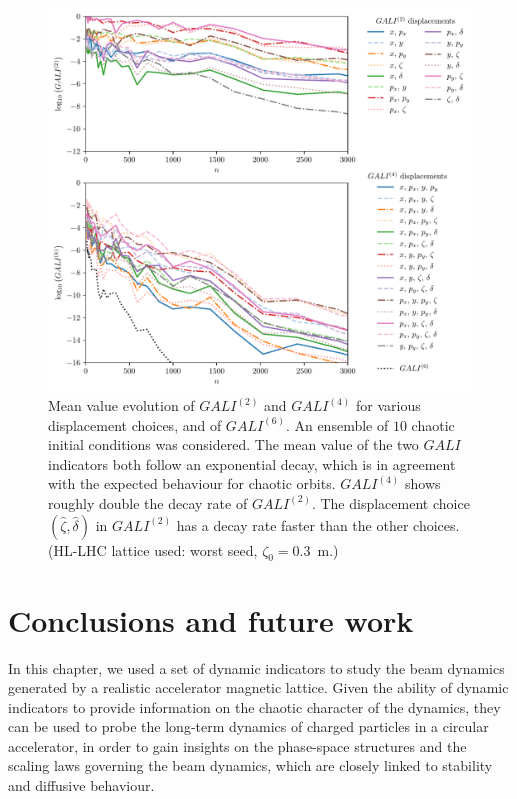 \begin{figure}
    \centering
    \includegraphics[width=1.0\textwidth]{6_lhc_dynamic_indicators/figs/updated/evolution_gali_4_chaos.pdf}
    \caption{Mean value evolution of $GALI^{(2)}$ and $GALI^{(4)}$ for various displacement choices, and of $GALI^{(6)}$. An ensemble of $10$ chaotic initial conditions was considered. The mean value of the two $GALI$ indicators both follow an exponential decay, which is in agreement with the expected behaviour for chaotic orbits. $GALI^{(4)}$ shows roughly double the decay rate of $GALI^{(2)}$. The displacement choice $(\hat{\zeta}, \hat{\delta})$ in $GALI^{(2)}$ has a decay rate faster than the other choices. (HL-LHC lattice used: worst seed, $\zeta_0=$\SI{0.3}{\meter}.)}
    \label{fig:gali2_4_chaos}
\end{figure}

\section{Conclusions and future work}\label{sec:8:conclusions}

In this chapter, we used a set of dynamic indicators to study the beam dynamics generated by a realistic accelerator magnetic lattice. Given the ability of dynamic indicators to provide information on the chaotic character of the dynamics, they can be used to probe the long-term dynamics of charged particles in a circular accelerator, in order to gain insights on the phase-space structures and the scaling laws governing the beam dynamics, which are closely linked to stability and diffusive behaviour.

